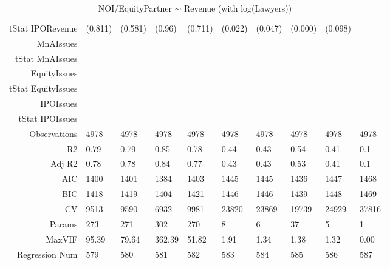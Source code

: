 \begin{table}[ht]
\begin{tabular}{rlllllllll}
  tStat IPORevenue & (0.811) & (0.581) & (0.96) & (0.711) & (0.022) & (0.047) & (0.000) & (0.098) &  \\ 
  MnAIssues &  &  &  &  &  &  &  &  &  \\ 
  tStat MnAIssues &  &  &  &  &  &  &  &  &  \\ 
  EquityIssues &  &  &  &  &  &  &  &  &  \\ 
  tStat EquityIssues &  &  &  &  &  &  &  &  &  \\ 
  IPOIssues &  &  &  &  &  &  &  &  &  \\ 
  tStat IPOIssues &  &  &  &  &  &  &  &  &  \\ 
  Observations & 4978 & 4978 & 4978 & 4978 & 4978 & 4978 & 4978 & 4978 & 4978 \\ 
  R2 & 0.79 & 0.79 & 0.85 & 0.78 & 0.44 & 0.43 & 0.54 & 0.41 & 0.1 \\ 
  Adj R2 & 0.78 & 0.78 & 0.84 & 0.77 & 0.43 & 0.43 & 0.53 & 0.41 & 0.1 \\ 
  AIC & 1400 & 1401 & 1384 & 1403 & 1445 & 1445 & 1436 & 1447 & 1468 \\ 
  BIC & 1418 & 1419 & 1404 & 1421 & 1446 & 1446 & 1439 & 1448 & 1469 \\ 
  CV & 9513 & 9590 & 6932 & 9981 & 23820 & 23869 & 19739 & 24929 & 37816 \\ 
  Params & 273 & 271 & 302 & 270 & 8 & 6 & 37 & 5 & 1 \\ 
  MaxVIF & 95.39 & 79.64 & 362.39 & 51.82 & 1.91 & 1.34 & 1.38 & 1.32 & 0.00 \\ 
  Regression Num & 579 & 580 & 581 & 582 & 583 & 584 & 585 & 586 & 587 \\ 
   \hline
\end{tabular}
\caption{NOI/EquityPartner $\sim$ Revenue (with log(Lawyers))} 
\end{table}
